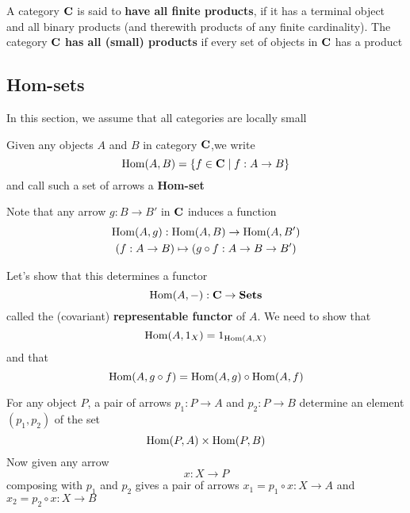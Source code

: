 \documentclass[11pt]{article}
\begin{document}
\begin{definition}[]
A category \(\operatorname{\textbf{C}}\) is said to \textbf{have all finite products}, if it has a terminal
object and all binary products (and therewith products of any finite
cardinality). The category \(\operatorname{\textbf{C}}\) \textbf{has all (small) products} if every set of
objects in \(\operatorname{\textbf{C}}\) has a product
\end{definition}


\subsection{Hom-sets}
\label{sec:org81a143c}
In this section, we assume that all categories are locally small

Given any objects \(A\) and \(B\)  in category \(\operatorname{\textbf{C}}\),we write
\begin{equation*}
\operatorname{Hom}(A,B)=\{f\in\operatorname{\textbf{C}}\mid f:A\to B\}
\end{equation*}
and call such a set of arrows a \textbf{Hom-set}

Note that any arrow \(g:B\to B'\) in \(\operatorname{\textbf{C}}\) induces a function
\begin{gather*}
\operatorname{Hom}(A,g):\operatorname{Hom}(A,B)\to\operatorname{Hom}(A,B')\\
(f:A\to B)\mapsto(g\circ f:A\to B\to B')
\end{gather*}

Let's show that this determines a functor
\begin{equation*}
\operatorname{Hom}(A,-):\operatorname{\textbf{C}}\to\operatorname{\textbf{Sets}}
\end{equation*}
called the (covariant) \textbf{representable functor} of \(A\). We need to show that
\begin{equation*}
\operatorname{Hom}(A,1_X)=1_{\operatorname{Hom}(A,X)}
\end{equation*}
and that
\begin{equation*}
\operatorname{Hom}(A,g\circ f)=\operatorname{Hom}(A,g)\circ\operatorname{Hom}(A,f)
\end{equation*}

For any object \(P\), a pair of arrows \(p_1:P\to A\) and \(p_2:P\to B\)
determine an element \((p_1,p_2)\) of the set
\begin{equation*}
\operatorname{Hom}(P,A)\times\operatorname{Hom}(P,B)
\end{equation*}
Now given any arrow
\begin{equation*}
x:X\to P
\end{equation*}
composing with \(p_1\) and \(p_2\) gives a pair of arrows
\(x_1=p_1\circ x:X\to A\) and \(x_2=p_2\circ x:X\to B\)
\end{document}
